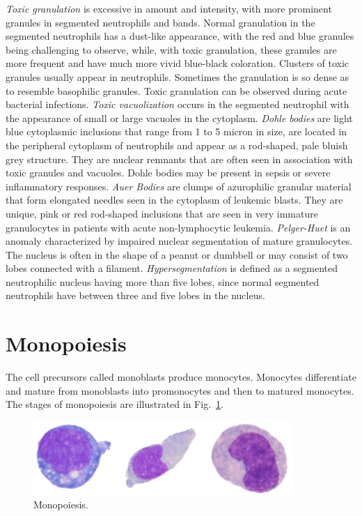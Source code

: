\documentclass[final,a4paper,12pt,english]{UnicaPhdThesis3}
\begin{document}
{\textit{Toxic granulation} is excessive in amount and intensity, with more prominent granules in segmented neutrophils and bands. Normal granulation in the segmented neutrophils has a dust-like appearance, with the red and blue granules being challenging to observe, while, with toxic granulation, these granules are more frequent and have much more vivid blue-black coloration. Clusters of toxic granules usually appear in neutrophils. Sometimes the granulation is so dense as to resemble basophilic granules. Toxic granulation can be observed during acute bacterial infections. \textit{Toxic vacuolization} occurs in the segmented neutrophil with the appearance of small or large vacuoles in the cytoplasm. \textit{Dohle bodies} are light blue cytoplasmic inclusions that range from 1 to 5 micron in size, are located in the peripheral cytoplasm of neutrophils and appear as a rod-shaped, pale bluish grey structure. They are nuclear remnants that are often seen in association with toxic granules and vacuoles. Dohle bodies may be present in sepsis or severe inflammatory responses. \textit{Auer Bodies} are clumps of azurophilic granular material that form elongated needles seen in the cytoplasm of leukemic blasts. They are unique, pink or red rod-shaped inclusions that are seen in very immature granulocytes in patients with acute non-lymphocytic leukemia. \textit{Pelger-Huet} is an anomaly characterized by impaired nuclear segmentation of mature granulocytes. The nucleus is often in the shape of a peanut or dumbbell or may consist of two lobes connected with a filament. \textit{Hypersegmentation} is defined as a segmented neutrophilic nucleus having more than five lobes, since normal segmented neutrophils have between three and five lobes in the nucleus. 

\section{Monopoiesis}
The cell precursors called monoblasts produce monocytes. Monocytes differentiate and mature from monoblasts into promonocytes and then to matured monocytes. The stages of monopoiesis are illustrated in Fig.~\ref{fig:Monopoiesis}.

\begin{figure}[!htbp]
\centering
\includegraphics[width=0.88\textwidth]{images/monopoiesis}
\caption{\label{fig:Monopoiesis} Monopoiesis.}
\end{figure}

}
\end{document}
